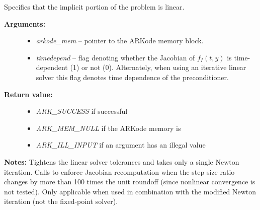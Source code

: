 \documentclass[letterpaper,10pt,english]{sphinxmanual}
\begin{document}
\begin{fulllineitems}
\label{c_interface/User_callable:c.ARKodeSetLinear}
Specifies that the implicit portion of the problem is linear.
\begin{description}
\item[{\textbf{Arguments:}}] \leavevmode\begin{itemize}
\item {} 
\emph{arkode\_mem} -- pointer to the ARKode memory block.

\item {} 
\emph{timedepend} -- flag denoting whether the Jacobian of
\(f_I(t,y)\) is time-dependent (1) or not (0).
Alternately, when using an iterative linear solver this flag
denotes time dependence of the preconditioner.

\end{itemize}

\item[{\textbf{Return value:}}] \leavevmode\begin{itemize}
\item {} 
\emph{ARK\_SUCCESS} if successful

\item {} 
\emph{ARK\_MEM\_NULL} if the ARKode memory is 

\item {} 
\emph{ARK\_ILL\_INPUT} if an argument has an illegal value

\end{itemize}

\end{description}

\textbf{Notes:} Tightens the linear solver tolerances and takes only a
single Newton iteration.  Calls {\hyperref[c_interface/User_callable:c.ARKodeSetDeltaGammaMax]{\emph{}}}
to enforce Jacobian recomputation when the step size ratio changes
by more than 100 times the unit roundoff (since nonlinear
convergence is not tested).  Only applicable when used in
combination with the modified Newton iteration (not the fixed-point
solver).

\end{fulllineitems}

\end{document}
